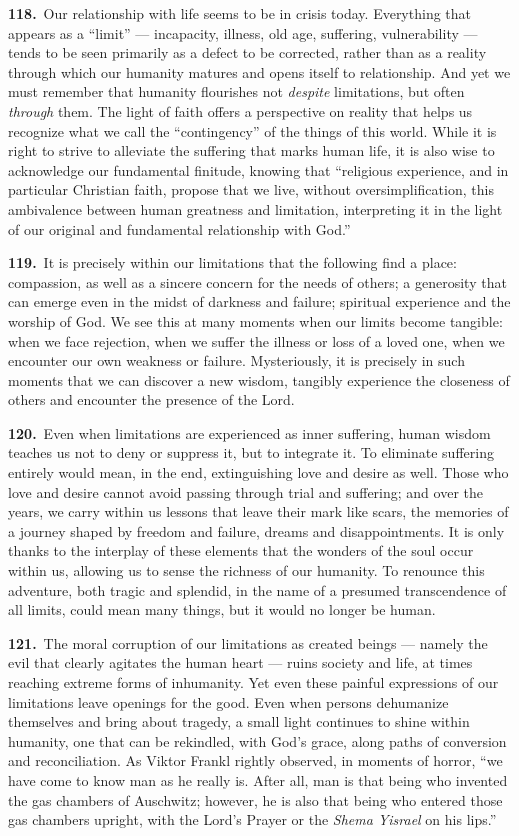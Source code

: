 \documentclass{article}
\begin{document}
\textbf{118.}\ Our relationship with life seems to be in crisis today. Everything that appears as a ``limit'' --- incapacity, illness, old age, suffering, vulnerability --- tends to be seen primarily as a defect to be corrected, rather than as a reality through which our humanity matures and opens itself to relationship. And yet we must remember that humanity flourishes not \emph{despite} limitations, but often \emph{through} them. The light of faith offers a perspective on reality that helps us recognize what we call the ``contingency'' of the things of this world. While it is right to strive to alleviate the suffering that marks human life, it is also wise to acknowledge our fundamental finitude, knowing that ``religious experience, and in particular Christian faith, propose that we live, without oversimplification, this ambivalence between human greatness and limitation, interpreting it in the light of our original and fundamental relationship with God.''\cite{n131}

\textbf{119.}\ It is precisely within our limitations that the following find a place: compassion, as well as a sincere concern for the needs of others; a generosity that can emerge even in the midst of darkness and failure; spiritual experience and the worship of God. We see this at many moments when our limits become tangible: when we face rejection, when we suffer the illness or loss of a loved one, when we encounter our own weakness or failure. Mysteriously, it is precisely in such moments that we can discover a new wisdom, tangibly experience the closeness of others and encounter the presence of the Lord.

\textbf{120.}\ Even when limitations are experienced as inner suffering, human wisdom teaches us not to deny or suppress it, but to integrate it. To eliminate suffering entirely would mean, in the end, extinguishing love and desire as well. Those who love and desire cannot avoid passing through trial and suffering; and over the years, we carry within us lessons that leave their mark like scars, the memories of a journey shaped by freedom and failure, dreams and disappointments. It is only thanks to the interplay of these elements that the wonders of the soul occur within us, allowing us to sense the richness of our humanity.\cite{n132} To renounce this adventure, both tragic and splendid, in the name of a presumed transcendence of all limits, could mean many things, but it would no longer be human.

\textbf{121.}\ The moral corruption of our limitations as created beings --- namely the evil that clearly agitates the human heart --- ruins society and life, at times reaching extreme forms of inhumanity. Yet even these painful expressions of our limitations leave openings for the good. Even when persons dehumanize themselves and bring about tragedy, a small light continues to shine within humanity, one that can be rekindled, with God's grace, along paths of conversion and reconciliation. As Viktor Frankl rightly observed, in moments of horror, ``we have come to know man as he really is. After all, man is that being who invented the gas chambers of Auschwitz; however, he is also that being who entered those gas chambers upright, with the Lord's Prayer or the \emph{Shema Yisrael} on his lips.''\cite{n133}
\end{document}
